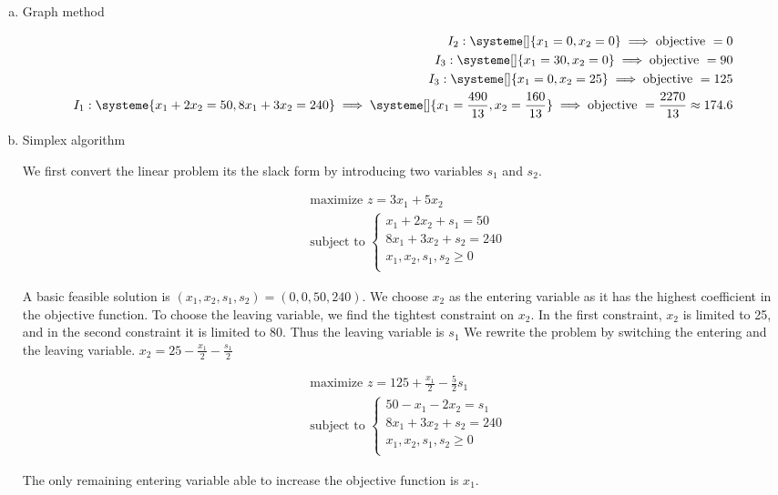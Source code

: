 \documentclass[a4paper, 10pt, twoside]{article}
\begin{document}
\begin{enumerate}[a)]
    \item Graph method
    
    \begin{align*}
        I_2 : 
        \systeme[]{
            x_1 = 0,
            x_2 = 0
        }
        \implies \text{objective } = 0 \\
        I_3 : 
        \systeme[]{
            x_1 = 30,
            x_2 = 0
        }
        \implies \text{objective } = 90 \\
        I_3 : 
        \systeme[]{
            x_1 = 0,
            x_2 = 25
        }
        \implies \text{objective } = 125 \\
        I_1 : 
        \systeme{
            x_1+2x_2=50,
            8x_1+3x_2=240
        }
        \implies
        \systeme[]{
            x_1 = \frac{490}{13},
            x_2 = \frac{160}{13}
        }
        \implies \text{objective } = \frac{2270}{13} \approx 174.6 \\
    \end{align*}

    \item Simplex algorithm

    We first convert the linear problem its the slack form by introducing two variables $s_1$ and $s_2$.

    \begin{align*}
        &\text{maximize } z = 3x_1 + 5x_2 \\
        &\text{subject to }
        \begin{cases}
            x_1 + 2x_2 + s_1 = 50 \\
            8x_1 + 3x_2 + s_2 = 240 \\
            x_1, x_2, s_1, s_2 \ge 0 \\
        \end{cases}    
    \end{align*}

    A basic feasible solution is $(x_1, x_2, s_1, s_2) = (0, 0, 50, 240)$. We choose $x_2$ as the entering variable as it has the highest coefficient in the objective function. To choose the leaving variable, we find the tightest constraint on $x_2$. In the first constraint, $x_2$ is limited to 25, and in the second constraint it is limited to 80. Thus the leaving variable is $s_1$ We rewrite the problem by switching the entering and the leaving variable. $x_2 = 25 - \frac{x_1}{2} - \frac{s_1}{2}$

    \begin{align*}
        &\text{maximize } z = 125 + \frac{x_1}{2} - \frac{5}{2}s_1 \\
        &\text{subject to }
        \begin{cases}
            50-x_1-2x_2 = s_1 \\
            8x_1 + 3x_2 + s_2 = 240 \\
            x_1, x_2, s_1, s_2 \ge 0 \\
        \end{cases}    
    \end{align*}

    The only remaining entering variable able to increase the objective function is $x_1$. 
\end{enumerate}
\end{document}
